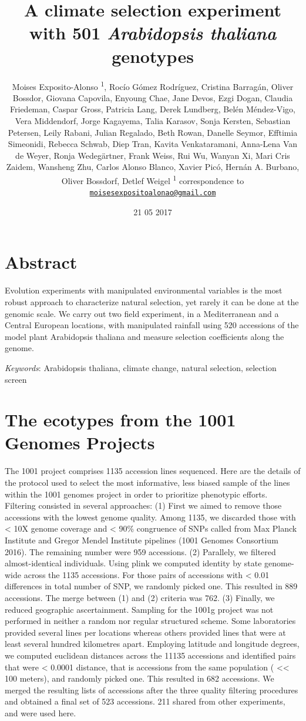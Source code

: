 \documentclass[]{article}
\title{A climate selection experiment with 501 \emph{Arabidopsis thaliana}
genotypes \newline}
\author{Moises Exposito-Alonso \textsuperscript{1}, Rocío Gómez Rodríguez,
Cristina Barragán, Oliver Bossdor, Giovana Capovila, Enyoung Chae, Jane
Devos, Ezgi Dogan, Claudia Friedeman, Caspar Gross, Patricia Lang, Derek
Lundberg, Belén Méndez-Vigo, Vera Middendorf, Jorge Kagayema, Talia
Karasov, Sonja Kersten, Sebastian Petersen, Leily Rabani, Julian
Regalado, Beth Rowan, Danelle Seymor, Efftimia Simeonidi, Rebecca
Schwab, Diep Tran, Kavita Venkataramani, Anna-Lena Van de Weyer, Ronja
Wedegärtner, Frank Weiss, Rui Wu, Wanyan Xi, Mari Cris Zaidem, Wansheng
Zhu, Carlos Alonso Blanco, Xavier Picó, Hernán A. Burbano, Oliver
Bossdorf, Detlef Weigel \newline \newline  \textsuperscript{1}
correspondence to
\href{mailto:moisesexpositoalonao@gmail.com}{\nolinkurl{moisesexpositoalonao@gmail.com}}}
\date{21 05 2017}
\begin{document}
\maketitle

{
\setcounter{tocdepth}{2}
\tableofcontents
}
\pagebreak

\section{Abstract}\label{abstract}

Evolution experiments with manipulated environmental variables is the
most robust approach to characterize natural selection, yet rarely it
can be done at the genomic scale. We carry out two field experiment, in
a Mediterranean and a Central European locations, with manipulated
rainfall using 520 accessions of the model plant Arabidopsis thaliana
and measure selection coefficients along the genome.

\emph{Keywords}: Arabidopsis thaliana, climate change, natural
selection, selection screen

\section{The ecotypes from the 1001 Genomes
Projects}\label{the-ecotypes-from-the-1001-genomes-projects}

The 1001 project comprises 1135 accession lines sequenced. Here are the
details of the protocol used to select the most informative, less biased
sample of the lines within the 1001 genomes project in order to
prioritize phenotypic efforts. Filtering consisted in several
approaches: (1) First we aimed to remove those accessions with the
lowest genome quality. Among 1135, we discarded those with \textless{}
10X genome coverage and \textless{} 90\% congruence of SNPs called from
Max Planck Institute and Gregor Mendel Institute pipelines (1001 Genomes
Consortium 2016). The remaining number were 959 accessions. (2)
Parallely, we filtered almost-identical individuals. Using plink we
computed identity by state genome-wide across the 1135 accessions. For
those pairs of accessions with \textless{} 0.01 differences in total
number of SNP, we randomly picked one. This resulted in 889 accessions.
The merge between (1) and (2) criteria was 762. (3) Finally, we reduced
geographic ascertainment. Sampling for the 1001g project was not
performed in neither a random nor regular structured scheme. Some
laboratories provided several lines per locations whereas others
provided lines that were at least several hundred kilometres apart.
Employing latitude and longitude degrees, we computed euclidean
distances across the 11135 accessions and identified pairs that were
\textless{} 0.0001 distance, that is accessions from the same population
( \textless{}\textless{} 100 meters), and randomly picked one. This
resulted in 682 accessions. We merged the resulting lists of accessions
after the three quality filtering procedures and obtained a final set of
523 accessions. 211 shared from other experiments, and were used here.
\end{document}
